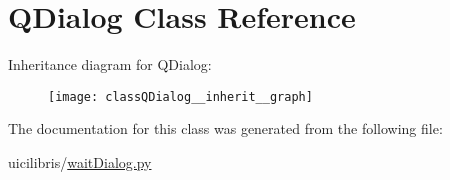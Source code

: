 \hypertarget{classQDialog}{\section{\-Q\-Dialog \-Class \-Reference}
\label{classQDialog}
}


\-Inheritance diagram for \-Q\-Dialog\-:
\nopagebreak
\begin{figure}[H]
\begin{center}
\leavevmode
\texttt{[image: classQDialog\_\_inherit\_\_graph]}
\end{center}
\end{figure}


\-The documentation for this class was generated from the following file\-:\begin{DoxyCompactItemize}
\item 
uicilibris/\hyperlink{waitDialog_8py}{wait\-Dialog.\-py}\end{DoxyCompactItemize}
